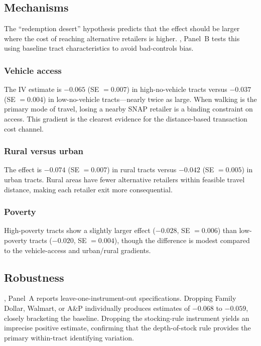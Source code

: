 \documentclass[12pt]{article}
\begin{document}
\subsection{Mechanisms}



The ``redemption desert'' hypothesis predicts that the effect should be larger where the cost of reaching alternative retailers is higher. , Panel~B tests this using baseline tract characteristics to avoid bad-controls bias.

\subsubsection*{Vehicle access} The IV estimate is $-0.065$ (SE $= 0.007$) in high-no-vehicle tracts versus $-0.037$ (SE $= 0.004$) in low-no-vehicle tracts---nearly twice as large. When walking is the primary mode of travel, losing a nearby SNAP retailer is a binding constraint on access. This gradient is the clearest evidence for the distance-based transaction cost channel.

\subsubsection*{Rural versus urban} The effect is $-0.074$ (SE $= 0.007$) in rural tracts versus $-0.042$ (SE $= 0.005$) in urban tracts. Rural areas have fewer alternative retailers within feasible travel distance, making each retailer exit more consequential.

\subsubsection*{Poverty} High-poverty tracts show a slightly larger effect ($-0.028$, SE $= 0.006$) than low-poverty tracts ($-0.020$, SE $= 0.004$), though the difference is modest compared to the vehicle-access and urban/rural gradients.

\subsection{Robustness}

, Panel~A reports leave-one-instrument-out specifications. Dropping Family Dollar, Walmart, or A\&P individually produces estimates of $-0.068$ to $-0.059$, closely bracketing the baseline. Dropping the stocking-rule instrument yields an imprecise positive estimate, confirming that the depth-of-stock rule provides the primary within-tract identifying variation.
\end{document}
